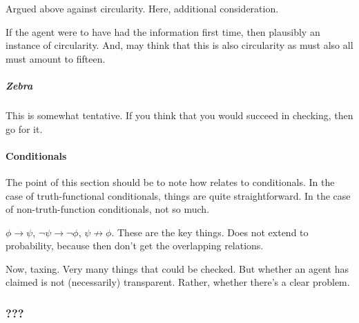 \begin{note}
  Argued above against circularity.
  Here, additional consideration.

  If the agent were to have had the information first time, then plausibly an instance of circularity.
  And, may think that this is also circularity as must also all must amount to fifteen.
\end{note}


\subparagraph{Zebra}

\begin{note}
  This is somewhat tentative.
  If you think that you would succeed in checking, then go for it.
\end{note}

\paragraph{Conditionals}

\begin{note}
  \color{red}
  The point of this section should be to note how \ideaCS{} relates to conditionals.
  In the case of truth-functional conditionals, things are quite straightforward.
  In the case of non-truth-function conditionals, not so much.
\end{note}

\begin{note}
  \(\phi \rightarrow \psi\), \(\lnot\psi \rightarrow \lnot\phi\), \(\psi \not\rightarrow \phi\).
  These are the key things.
  Does not extend to probability, because then don't get the overlapping relations.
\end{note}


\begin{note}
  Now, taxing.
  Very many things that could be checked.
  But whether an agent has claimed \support{} is not (necessarily) transparent.
  Rather, whether there's a clear problem.
\end{note}

\hozline


\subsubsection{???}

